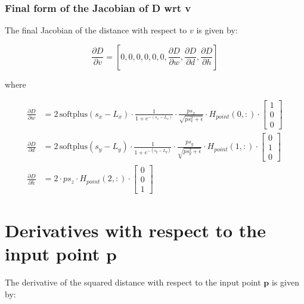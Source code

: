 \documentclass[11pt]{article}
\begin{document}
    \subsubsection*{Final form of the Jacobian of D wrt v}
        The final Jacobian of the distance with respect to \(v\) is given by:

        \begin{equation}
            \frac{\partial D}{\partial v} = \left[0,0,0,0,0,0, \frac{\partial D}{\partial w}, \frac{\partial D}{\partial d}, \frac{\partial D}{\partial h}\right]
        \end{equation}

        where

        \begin{equation}
            \begin{aligned}
                \frac{\partial D}{\partial w} &= 2\,\text{softplus}(s_x - L_x) \cdot \frac{1}{1 + e^{-(s_x - L_x)}} \cdot \frac{ps_{x}}{\sqrt{ps_{x}^2 + \epsilon}} \cdot H_{point}(0,:) \cdot \begin{bmatrix} 1 \\ 0 \\ 0 \end{bmatrix}\\
                \frac{\partial D}{\partial d} &= 2\,\text{softplus}(s_y - L_y) \cdot \frac{1}{1 + e^{-(s_y - L_y)}} \cdot \frac{ps_{y}}{\sqrt{ps_{y}^2 + \epsilon}} \cdot H_{point}(1,:) \cdot \begin{bmatrix} 0 \\ 1 \\ 0 \end{bmatrix}\\
                \frac{\partial D}{\partial h} &= 2 \cdot ps_z \cdot H_{point}(2,:) \cdot \begin{bmatrix} 0 \\ 0 \\ 1 \end{bmatrix}
            \end{aligned}
        \end{equation}

    \section*{Derivatives with respect to the input point \(\mathbf{p}\)}

        The derivative of the squared distance with respect to the input point \(\mathbf{p}\) is given by:
\end{document}
